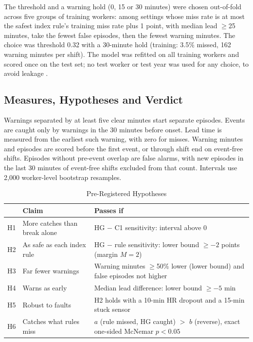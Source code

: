 \documentclass[conference,a4paper]{IEEEtran}
\begin{document}
The threshold and a warning hold (0, 15 or 30 minutes) were chosen out-of-fold across five groups of training workers: among settings whose miss rate is at most the safest index rule's training miss rate plus 1 point, with median lead $\ge$25 minutes, take the fewest false episodes, then the fewest warning minutes. The choice was threshold 0.32 with a 30-minute hold (training: 3.5\% missed, 162 warning minutes per shift). The model was refitted on all training workers and scored once on the test set; no test worker or test year was used for any choice, to avoid leakage \cite{kapoor}.

\subsection{Measures, Hypotheses and Verdict}\label{sec:hyp}
Warnings separated by at least five clear minutes start separate episodes. Events are caught only by warnings in the 30 minutes before onset. Lead time is measured from the earliest such warning, with zero for misses. Warning minutes and episodes are scored before the first event, or through shift end on event-free shifts. Episodes without pre-event overlap are false alarms, with new episodes in the last 30 minutes of event-free shifts excluded from that count. Intervals use 2,000 worker-level bootstrap resamples.

\begin{table}[!t]
\caption{Pre-Registered Hypotheses}
\label{tab:hyp}
\centering
\footnotesize
\begin{tabular}{@{}p{0.45cm}p{2.3cm}p{4.65cm}@{}}
\toprule
 & Claim & Passes if \\
\midrule
H1 & More catches than break alone & HG $-$ C1 sensitivity: interval above 0 \\
H2 & As safe as each index rule & HG $-$ rule sensitivity: lower bound $\ge -2$ points (margin $M=2$) \\
H3 & Far fewer warnings & Warning minutes $\ge$50\% lower (lower bound) and false episodes not higher \\
H4 & Warns as early & Median lead difference: lower bound $\ge -5$ min \\
H5 & Robust to faults & H2 holds with a 10-min HR dropout and a 15-min stuck sensor \\
H6 & Catches what rules miss & $a$ (rule missed, HG caught) $>$ $b$ (reverse), exact one-sided McNemar $p<0.05$ \\
\bottomrule
\end{tabular}
\end{table}
\end{document}
